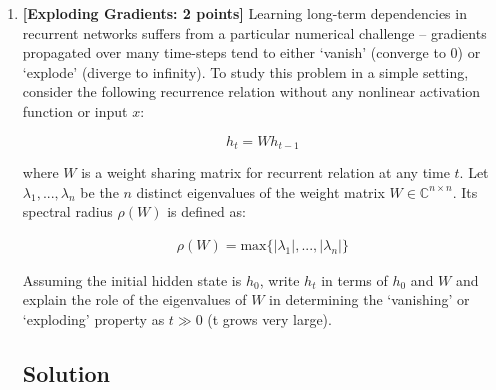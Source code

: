 \documentclass[11pt,english]{article}
\newcommand{\field}[1]{\mathbb{#1}}
\newcommand{\C}{\field{C}} %
\begin{document}
\begin{enumerate}[resume]
Any candidate sequence $\vec{y}^*$ completed at some future step $T \ge t+1$ must originate by extending one of the active beams present in $B_t$:
\[
\exists \vec{y} \in B_t \quad \text{such that} \quad \vec{y}^* = \vec{y} \circ y_{t+1} \circ \cdots \circ y_T
\]
Applying the monotonic non-increasing property:
\[
s(\vec{y}^*) \le s(\vec{y})
\]
By definition, $\vec{y}^1$ is the highest-scoring beam in $B_t$, which implies:
\[
s(\vec{y}) \le s(\vec{y}^1), \quad \forall \vec{y} \in B_t
\]
Combining these inequalities with the given stopping condition $s(\vec{y}^1) \le s_{\text{best}}^{(t)}$:
\[
s(\vec{y}^*) \le s(\vec{y}) \le s(\vec{y}^1) \le s_{\text{best}}^{(t)}
\]

Therefore, \(s(\vec{y}^*)\leq s_{\text{best}}^{(t)}\). No future completed sequence extending a beam in \(B_t\) can achieve a score greater than the best completed sequence already found. Thus, the stated stopping condition is valid for terminating the current beam search.

\newpage
\item
\textbf{[Exploding Gradients: 2 points]}
Learning long-term dependencies in recurrent networks suffers from a particular numerical challenge -- 
gradients propagated over many time-steps tend to either `vanish' (converge to 0) or `explode' (diverge to infinity). To study this problem in a simple setting, consider the following recurrence relation without any nonlinear activation function or input $x$:

\begin{equation} \label{eq:simple_recurrence}
h_{t} = W h_{t-1}
\end{equation}

where $W$ is a weight sharing matrix for recurrent relation at any time $t$. Let $\lambda_1, ..., \lambda_n$ be the $n$ distinct eigenvalues of the weight matrix $W \in \C^{n \times n}$. Its spectral radius $\rho(W)$ is defined as: 

\begin{align}
\rho(W) = \text{max}\{|\lambda_1|, ... ,|\lambda_n| \}
\end{align}

Assuming the initial hidden state is $h_0$, write $h_t$ in terms of $h_0$ and $W$ and explain the role of the eigenvalues of $W$ in determining the `vanishing' or `exploding' property as $t\gg0$ (t grows very large).


\subsection*{Solution}


\end{enumerate}
\end{document}
